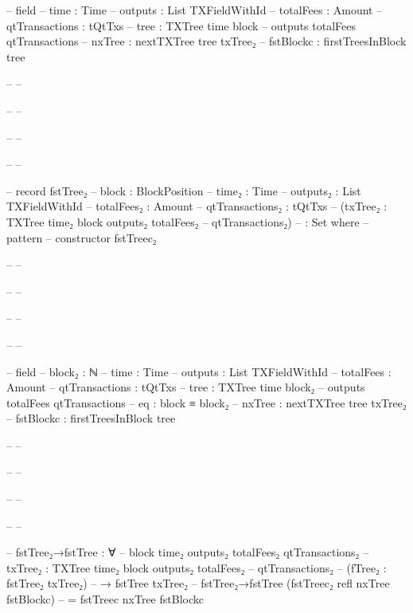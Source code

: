 \documentclass{beamer}
\begin{document}
{\begin{frame}
\begin{code}
--         field
--           {time}               : Time
--           {outputs}            : List TXFieldWithId
--           {totalFees}          : Amount
--           {qtTransactions}     : tQtTxs
--           {tree}               : TXTree time block
--             outputs totalFees qtTransactions
--           nxTree               : nextTXTree tree txTree₂
--           fstBlockc            : firstTreesInBlock tree

-- -- \end{code}
-- -- \end{frame}
-- -- \begin{frame}
-- -- \begin{code}

--       record fstTree₂
--         {block : BlockPosition}
--         {time₂ : Time}
--         {outputs₂ : List TXFieldWithId}
--         {totalFees₂ : Amount}
--         {qtTransactions₂ : tQtTxs}
--         (txTree₂ : TXTree time₂ block outputs₂ totalFees₂
--           qtTransactions₂)
--         : Set where
--         pattern
--         constructor fstTreec₂

-- -- \end{code}
-- -- \end{frame}
-- -- \begin{frame}
-- -- \begin{code}

--         field
--           {block₂}              : ℕ
--           {time}               : Time
--           {outputs}            : List TXFieldWithId
--           {totalFees}          : Amount
--           {qtTransactions}     : tQtTxs
--           {tree}               : TXTree time block₂
--             outputs totalFees qtTransactions
--           eq                   : block ≡ block₂
--           nxTree               : nextTXTree tree txTree₂
--           fstBlockc            : firstTreesInBlock tree

-- -- \end{code}
-- -- \end{frame}
-- -- \begin{frame}
-- -- \begin{code}

--       fstTree₂→fstTree : ∀
--         {block time₂ outputs₂ totalFees₂ qtTransactions₂}
--         {txTree₂ : TXTree time₂ block outputs₂ totalFees₂
--           qtTransactions₂}
--         (fTree₂ : fstTree₂ txTree₂)
--         → fstTree txTree₂
--       fstTree₂→fstTree (fstTreec₂ refl nxTree fstBlockc)
--         = fstTreec nxTree fstBlockc


\end{code}
\end{frame}}
\end{document}
